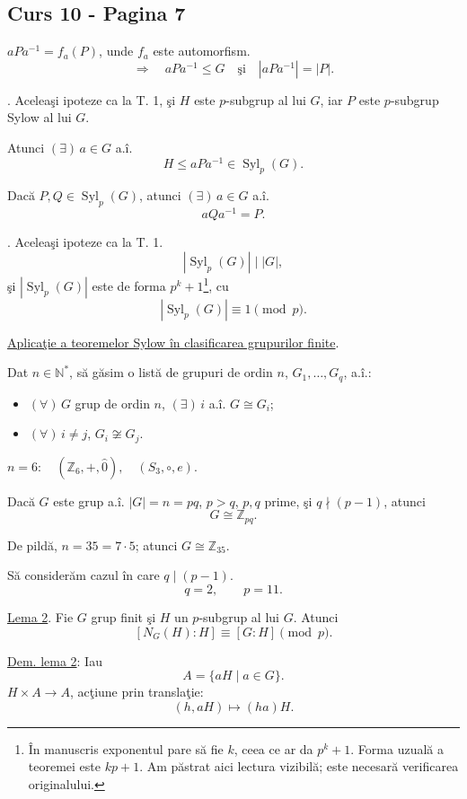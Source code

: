 \bigskip

\subsection*{Curs 10 - Pagina 7}

\noindent $aPa^{-1}=f_a(P)$, unde $f_a$ este automorfism.
\[
\Longrightarrow\quad aPa^{-1}\leq G
\quad\text{şi}\quad |aPa^{-1}|=|P|.
\]

\bigskip
\noindent{}. Aceleaşi ipoteze ca la T. 1,
şi $H$ este $p$-subgrup al lui $G$, iar $P$ este $p$-subgrup Sylow al lui $G$.

\medskip
\noindent Atunci $(\exists)\,a\in G$ a.î.
\[
H\leq aPa^{-1}\in\operatorname{Syl}_p(G).
\]

\noindent Dacă $P,Q\in\operatorname{Syl}_p(G)$, atunci
$(\exists)\,a\in G$ a.î.
\[
aQa^{-1}=P.
\]

\bigskip
\noindent{}. Aceleaşi ipoteze ca la T. 1.
\[
|\operatorname{Syl}_p(G)|\mid |G|,
\]
\noindent şi $|\operatorname{Syl}_p(G)|$ este de forma
$p^k+1$\footnote{În manuscris exponentul pare să fie $k$,
ceea ce ar da $p^k+1$. Forma uzuală a teoremei este $kp+1$.
Am păstrat aici lectura vizibilă; este necesară verificarea originalului.},
cu
\[
|\operatorname{Syl}_p(G)|\equiv 1\pmod p.
\]

\bigskip
\noindent\underline{Aplicaţie a teoremelor Sylow în clasificarea grupurilor finite}.

\medskip
\noindent Dat $n\in\mathbb{N}^{*}$, să găsim o listă de grupuri de ordin $n$,
$G_1,\ldots,G_q$, a.î.:
\begin{itemize}
\item $(\forall)\,G$ grup de ordin $n$, $(\exists)\,i$ a.î. $G\cong G_i$;
\item $(\forall)\,i\neq j$, $G_i\not\cong G_j$.
\end{itemize}

\noindent $n=6:\quad (\mathbb{Z}_6,+,\hat 0),\quad(S_3,\circ,e).$

\bigskip
\noindent{} Dacă $G$ este grup a.î.
$|G|=n=pq$, $p>q$, $p,q$ prime, şi $q\nmid(p-1)$,
atunci
\[
G\cong\mathbb{Z}_{pq}.
\]

\medskip
\noindent De pildă, $n=35=7\cdot5$; atunci $G\cong\mathbb{Z}_{35}$.

\noindent Să considerăm cazul în care $q\mid(p-1)$.
\[
q=2,\qquad p=11.
\]

\bigskip
\noindent\underline{Lema 2}. Fie $G$ grup finit şi $H$ un $p$-subgrup al lui $G$.
Atunci
\[
[N_G(H):H]\equiv[G:H]\pmod p.
\]

\medskip
\noindent\underline{Dem. lema 2}: Iau
\[
A=\{aH\mid a\in G\}.
\]
\noindent $H\times A\longrightarrow A$, acţiune prin translaţie:
\[
(h,aH)\longmapsto(ha)H.
\]
